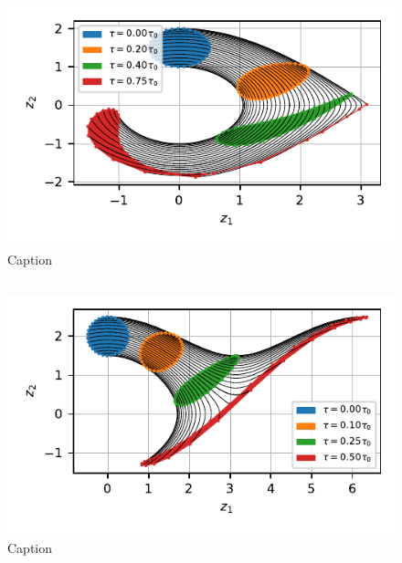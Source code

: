 \subsection{}
\begin{figure}[h!]
    \centering
    \includegraphics{CodeAndFigures/PendulumPhaseSpaceUs2e.pdf}
    \caption{Caption}
    \label{fig:pend2e}
\end{figure}

\subsection{}

\begin{figure}[h!]
    \centering
    \includegraphics{CodeAndFigures/PendulumPhaseSpaceUs2f.pdf}
    \caption{Caption}
    \label{fig:pend2f}
\end{figure}

\subsection{}
